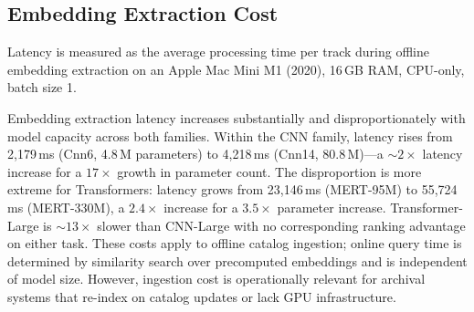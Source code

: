 \documentclass[sigconf]{acmart}
\begin{document}
\subsection{Embedding Extraction Cost}

Latency is measured as the average processing time per track during offline embedding extraction on an Apple Mac Mini M1 (2020), 16\,GB RAM, CPU-only, batch size 1.

\begin{table}[!htbp]
\centering
\caption{Embedding extraction cost, model size, and embedding dimensionality across model capacities. Parameter counts for CNN-based models are obtained from \cite{kong2020panns}, while Transformer parameter counts are based on publicly available pretrained checkpoints.}
\label{tab:latency_results}
\end{table}

Embedding extraction latency increases substantially and disproportionately with model capacity across both families. Within the CNN family, latency rises from 2{,}179\,ms (Cnn6, 4.8\,M parameters) to 4{,}218\,ms (Cnn14, 80.8\,M)---a ${\sim}2{\times}$ latency increase for a $17{\times}$ growth in parameter count. The disproportion is more extreme for Transformers: latency grows from 23{,}146\,ms (MERT-95M) to 55{,}724\,ms (MERT-330M), a $2.4{\times}$ increase for a $3.5{\times}$ parameter increase. Transformer-Large is ${\sim}13{\times}$ slower than CNN-Large with no corresponding ranking advantage on either task. These costs apply to offline catalog ingestion; online query time is determined by similarity search over precomputed embeddings and is independent of model size. However, ingestion cost is operationally relevant for archival systems that re-index on catalog updates or lack GPU infrastructure.
\end{document}
